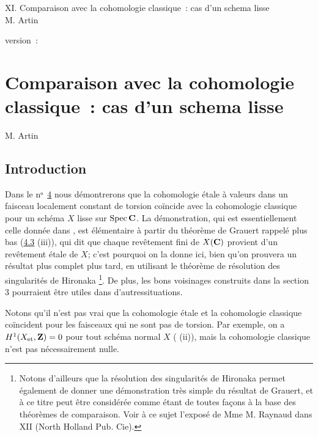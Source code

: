\documentclass[10pt]{../fichiers-configuration-latex/smfart}
\begin{document}
\begin{center}
XI. Comparaison avec la cohomologie classique : cas d'un schema lisse\\
M. Artin 
\end{center}

version : \showgitstatus{}
\tableofcontents

\else
\chapter{Comparaison avec la cohomologie classique : cas d'un schema lisse}
\begin{center}
M. Artin 
\end{center}
\fi

\setcounter{pageoriginal}{63}

\section{Introduction}\pageoriginale

Dans le nᵒ \hyperref[XI.sec4]{4} nous démontrerons que la cohomologie étale
à valeurs dans un faisceau localement constant de torsion coïncide
avec la cohomologie classique pour un schéma $X$ lisse sur
$\operatorname{Spec}\mathbf{C}$. La démonstration, qui est essentiellement celle
donnée dans \cite{SGA4-11:1}, est élémentaire à partir du théorème de Grauert
rappelé plus bas (\hyperref[XI.thm4.3]{4.3} (iii)), qui dit que chaque revêtement fini de
$X(\mathbf{C})$ provient d'un revêtement étale de $X$; c'est pourquoi
on la donne ici, bien qu'on prouvera un résultat plus complet plus
tard, en utilisant le théorème de résolution des singularités de
Hironaka \cite{SGA4-11:3} \footnote[1]{Notons d'ailleurs que la résolution des
  singularités de Hironaka permet également de donner une
  démonstration très simple du résultat de Grauert, et à ce titre peut
être considérée comme étant de toutes façons à la base des
théorèmes de comparaison. Voir à ce sujet l'exposé de Mme M. Raynaud
dans  XII (North Holland Pub. Cie).}. De plus, les bons
voisinages  construits dans la section 3 pourraient être utiles dans
d'autres\pageoriginale situations.

Notons qu'il n'est pas vrai que la cohomologie étale et la cohomologie
classique coïncident pour les faisceaux qui ne sont pas de
torsion. Par exemple, on a $H^1(X_{\mathrm{et}},\mathbf{Z})=0$ pour tout
schéma normal $X$ ( (ii)), mais la cohomologie classique n'est
pas nécessairement nulle.
\end{document}
